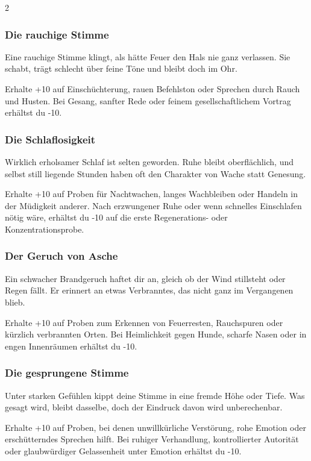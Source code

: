 {\begin{multicols*}{2}
        \subsubsection*{Die rauchige Stimme}
        Eine rauchige Stimme klingt, als hätte Feuer den Hals nie ganz verlassen. Sie schabt, trägt schlecht über feine Töne und bleibt doch im Ohr.

        \malspielwertebox
        {Erhalte +10 auf Einschüchterung, rauen Befehlston oder Sprechen durch Rauch und Husten.}
        {Bei Gesang, sanfter Rede oder feinem gesellschaftlichem Vortrag erhältst du -10.}

        \subsubsection*{Die Schlaflosigkeit}
        Wirklich erholsamer Schlaf ist selten geworden. Ruhe bleibt oberflächlich, und selbst still liegende Stunden haben oft den Charakter von Wache statt Genesung.

        \malspielwertebox
        {Erhalte +10 auf Proben für Nachtwachen, langes Wachbleiben oder Handeln in der Müdigkeit anderer.}
        {Nach erzwungener Ruhe oder wenn schnelles Einschlafen nötig wäre, erhältst du -10 auf die erste Regenerations- oder Konzentrationsprobe.}

        \subsubsection*{Der Geruch von Asche}
        Ein schwacher Brandgeruch haftet dir an, gleich ob der Wind stillsteht oder Regen fällt. Er erinnert an etwas Verbranntes, das nicht ganz im Vergangenen blieb.

        \malspielwertebox
        {Erhalte +10 auf Proben zum Erkennen von Feuerresten, Rauchspuren oder kürzlich verbrannten Orten.}
        {Bei Heimlichkeit gegen Hunde, scharfe Nasen oder in engen Innenräumen erhältst du -10.}

        \subsubsection*{Die gesprungene Stimme}
        Unter starken Gefühlen kippt deine Stimme in eine fremde Höhe oder Tiefe. Was gesagt wird, bleibt dasselbe, doch der Eindruck davon wird unberechenbar.

        \malspielwertebox
        {Erhalte +10 auf Proben, bei denen unwillkürliche Verstörung, rohe Emotion oder erschütterndes Sprechen hilft.}
        {Bei ruhiger Verhandlung, kontrollierter Autorität oder glaubwürdiger Gelassenheit unter Emotion erhältst du -10.}


\end{multicols*}}
